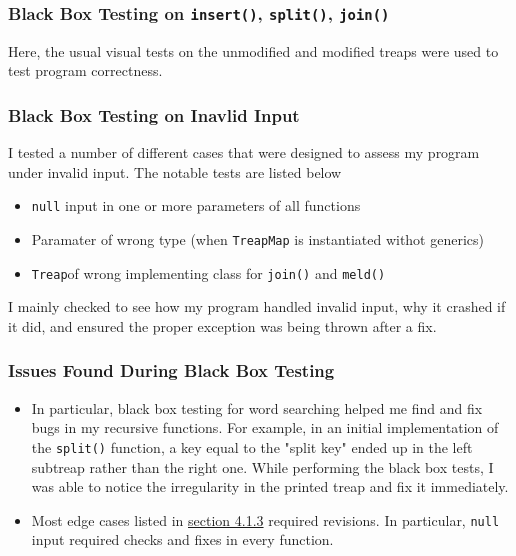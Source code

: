 \documentclass[11pt]{article}
\def\tt{\texttt}
\def\TM{\tt{TreapMap}}
\def\Treap{\tt{Treap}}
\def\ins{\tt{insert()}}
\def\split{\tt{split()}}
\def\join{\tt{join()}}
\def\meld{\tt{meld()}}
\begin{document}
\subsubsection{Black Box Testing on \ins, \split, \join}
Here, the usual visual tests on the unmodified and modified treaps were used to test program correctness.
\subsubsection{Black Box Testing on Inavlid Input}
\label{blackboxinvalid}
I tested a number of different cases that were designed to assess my program under invalid input. The notable tests are listed below
\begin{itemize}
	\item \tt{null} input in one or more parameters of all functions
	\item Paramater of wrong type (when \TM{} is instantiated withot generics)
	\item \Treap of wrong implementing class for \join{} and \meld{}
\end{itemize}
I mainly checked to see how my program handled invalid input, why it crashed if it did, and ensured the proper exception was being thrown after a fix.
\subsubsection{Issues Found During Black Box Testing}
\begin{itemize}
	\item In particular, black box testing for word searching helped me find and fix bugs in my recursive functions. For example, in an initial implementation of the \split{} function, a key equal to the "split key" ended up in the left subtreap rather than the right one. While performing the black box tests, I was able to notice the irregularity in the printed treap and fix it immediately. 
	\item Most edge cases listed in \hyperref[blackboxinvalid]{\color{blue}section 4.1.3} required revisions. In particular, \tt{null} input required checks and fixes in every function.
\end{itemize}
\end{document}
